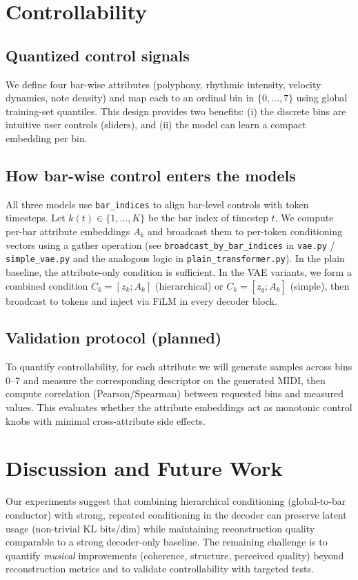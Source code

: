 \documentclass[10pt]{article}
\begin{document}
\section{Controllability}
\subsection{Quantized control signals}
We define four bar-wise attributes (polyphony, rhythmic intensity, velocity dynamics, note density) and map each to an ordinal bin in $\{0,\dots,7\}$ using global training-set quantiles. This design provides two benefits: (i) the discrete bins are intuitive user controls (sliders), and (ii) the model can learn a compact embedding per bin.

\subsection{How bar-wise control enters the models}
All three models use \texttt{bar\_indices} to align bar-level controls with token timesteps. Let $k(t)\in\{1,\dots,K\}$ be the bar index of timestep $t$. We compute per-bar attribute embeddings $A_k$ and broadcast them to per-token conditioning vectors using a gather operation (see \texttt{broadcast\_by\_bar\_indices} in \texttt{vae.py} / \texttt{simple\_vae.py} and the analogous logic in \texttt{plain\_transformer.py}). In the plain baseline, the attribute-only condition is sufficient. In the VAE variants, we form a combined condition $C_k=[z_k;A_k]$ (hierarchical) or $C_k=[z_g;A_k]$ (simple), then broadcast to tokens and inject via FiLM in every decoder block.

\subsection{Validation protocol (planned)}
To quantify controllability, for each attribute we will generate samples across bins 0--7 and measure the corresponding descriptor on the generated MIDI, then compute correlation (Pearson/Spearman) between requested bins and measured values. This evaluates whether the attribute embeddings act as monotonic control knobs with minimal cross-attribute side effects.

\section{Discussion and Future Work}
Our experiments suggest that combining hierarchical conditioning (global-to-bar conductor) with strong, repeated conditioning in the decoder can preserve latent usage (non-trivial KL bits/dim) while maintaining reconstruction quality comparable to a strong decoder-only baseline. The remaining challenge is to quantify \emph{musical} improvements (coherence, structure, perceived quality) beyond reconstruction metrics and to validate controllability with targeted tests.
\end{document}
